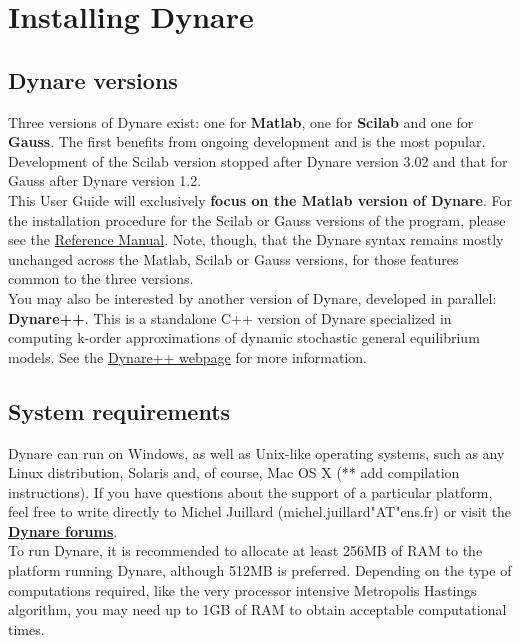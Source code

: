 \chapter{Installing Dynare} \label{ch:inst}

\section{Dynare versions}
Three versions of Dynare exist: one for \textbf{Matlab}, one for \textbf{Scilab} and one for \textbf{Gauss}. The first benefits from ongoing development and is the most popular. Development of the Scilab version stopped after Dynare version 3.02 and that for Gauss after Dynare version 1.2. \\

This User Guide will exclusively \textbf{focus on the Matlab version of Dynare}. For the installation procedure for the Scilab or Gauss versions of the program, please see the \href{http://www.cepremap.cnrs.fr/juillard/mambo/index.php?option=com_content&task=view&id=51&Itemid=84}{Reference Manual}. Note, though, that the Dynare syntax remains mostly unchanged across the Matlab, Scilab or Gauss versions, for those features common to the three versions. \\

You may also be interested by another version of Dynare, developed in parallel: \textbf{Dynare++}. This is a standalone C++ version of Dynare specialized in computing k-order approximations of dynamic stochastic general equilibrium models. See the \href{http://www.cepremap.cnrs.fr/juillard/mambo/index.php?option=com_content&task=view&id=53&Itemid=86}{Dynare++ webpage} for more information. 

\section{System requirements}
Dynare can run on Windows, as well as Unix-like operating systems, such as any Linux distribution, Solaris and, of course, Mac OS X (** add compilation instructions). If you have questions about the support of a particular platform, feel free to write directly to Michel Juillard (michel.juillard"AT"ens.fr) or visit the \href{http://www.cepremap.cnrs.fr/juillard/mambo/index.php?option=com_forum&Itemid=95&page=viewforum&f=1}{\textbf{Dynare forums}}. \\

To run Dynare, it is recommended to allocate at least 256MB of RAM to the platform running Dynare, although 512MB is preferred. Depending on the type of computations required, like the very processor intensive Metropolis Hastings algorithm, you may need up to 1GB of RAM to obtain acceptable computational times. \\

